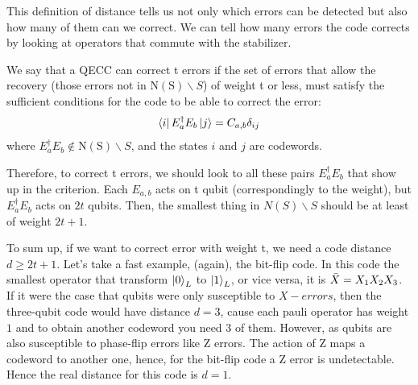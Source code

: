 This definition of distance tells us not only which errors can be detected but also how many of them can we correct. 
We can tell how many errors the code corrects by looking at operators that commute with the stabilizer. 



We say that a QECC can correct t errors if the set of errors that allow the recovery (those errors not in $\mathrm{N}(\mathrm{S}) \backslash S$) of weight t or less, must satisfy the sufficient conditions for the code to be able to correct the error: 
\begin{equation*}
    \bra{i} E_a^{\dagger}E_b \ket{j} = C_{a,b}\delta_{ij}
\end{equation*}
where $E_a^{\dagger}E_b \notin \mathrm{N}(\mathrm{S}) \backslash S$, and the states $i$ and $j$ are codewords.

Therefore, to correct t errors, we should look to all these pairs $E_a^\dagger E_b$ that show up in the criterion. Each $E_{a,b}$ acts on t qubit (correspondingly to the weight), but $E_a^\dagger E_b$ acts on $2t$ qubits. Then, the smallest thing in $N(S)\backslash S$ should be at least of weight $2t +1$. 


To sum up, if we want to correct error with  weight t, we need a code distance $d \ge 2t+1$.
Let's take a fast example, (again), the bit-flip code. 
In this code the smallest operator that transform $\ket{0}_L$ to $\ket{1}_L$, or vice versa, it
is $\Bar{X}=X_1X_2X_3$. 
If it were the case that qubits were only susceptible to $X-errors$, then the three-qubit code would have distance $d = 3$, cause each pauli operator has weight $1$
and to obtain another codeword you need 3 of them. 
However, as qubits are also susceptible to phase-flip errors like Z errors. The action of Z maps a codeword to another one, hence, for the bit-flip code a Z error is undetectable. Hence the real distance for this code is $d=1$. 



%




